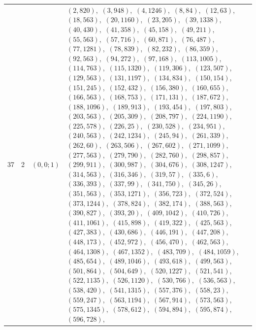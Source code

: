 \documentclass[11pt]{article}
\begin{document}
\begin{longtable}{@{}rrl>{\raggedright\arraybackslash}p{}@{}}
37 & 2 & $(0,0;1)$ & $(2,820)$,\allowbreak\ $(3,948)$,\allowbreak\ $(4,1246)$,\allowbreak\ $(8,84)$,\allowbreak\ $(12,63)$,\allowbreak\ $(18,563)$,\allowbreak\ $(20,1160)$,\allowbreak\ $(23,205)$,\allowbreak\ $(39,1338)$,\allowbreak\ $(40,430)$,\allowbreak\ $(41,358)$,\allowbreak\ $(45,158)$,\allowbreak\ $(49,211)$,\allowbreak\ $(55,563)$,\allowbreak\ $(57,716)$,\allowbreak\ $(60,871)$,\allowbreak\ $(76,487)$,\allowbreak\ $(77,1281)$,\allowbreak\ $(78,839)$,\allowbreak\ $(82,232)$,\allowbreak\ $(86,359)$,\allowbreak\ $(92,563)$,\allowbreak\ $(94,272)$,\allowbreak\ $(97,168)$,\allowbreak\ $(113,1005)$,\allowbreak\ $(114,763)$,\allowbreak\ $(115,1320)$,\allowbreak\ $(119,306)$,\allowbreak\ $(123,507)$,\allowbreak\ $(129,563)$,\allowbreak\ $(131,1197)$,\allowbreak\ $(134,834)$,\allowbreak\ $(150,154)$,\allowbreak\ $(151,245)$,\allowbreak\ $(152,432)$,\allowbreak\ $(156,380)$,\allowbreak\ $(160,655)$,\allowbreak\ $(166,563)$,\allowbreak\ $(168,753)$,\allowbreak\ $(171,131)$,\allowbreak\ $(187,672)$,\allowbreak\ $(188,1096)$,\allowbreak\ $(189,913)$,\allowbreak\ $(193,454)$,\allowbreak\ $(197,803)$,\allowbreak\ $(203,563)$,\allowbreak\ $(205,309)$,\allowbreak\ $(208,797)$,\allowbreak\ $(224,1190)$,\allowbreak\ $(225,578)$,\allowbreak\ $(226,25)$,\allowbreak\ $(230,528)$,\allowbreak\ $(234,951)$,\allowbreak\ $(240,563)$,\allowbreak\ $(242,1234)$,\allowbreak\ $(245,94)$,\allowbreak\ $(261,339)$,\allowbreak\ $(262,60)$,\allowbreak\ $(263,506)$,\allowbreak\ $(267,602)$,\allowbreak\ $(271,1099)$,\allowbreak\ $(277,563)$,\allowbreak\ $(279,790)$,\allowbreak\ $(282,760)$,\allowbreak\ $(298,857)$,\allowbreak\ $(299,911)$,\allowbreak\ $(300,987)$,\allowbreak\ $(304,676)$,\allowbreak\ $(308,1247)$,\allowbreak\ $(314,563)$,\allowbreak\ $(316,346)$,\allowbreak\ $(319,57)$,\allowbreak\ $(335,6)$,\allowbreak\ $(336,393)$,\allowbreak\ $(337,99)$,\allowbreak\ $(341,750)$,\allowbreak\ $(345,26)$,\allowbreak\ $(351,563)$,\allowbreak\ $(353,1271)$,\allowbreak\ $(356,723)$,\allowbreak\ $(372,524)$,\allowbreak\ $(373,1244)$,\allowbreak\ $(378,824)$,\allowbreak\ $(382,174)$,\allowbreak\ $(388,563)$,\allowbreak\ $(390,827)$,\allowbreak\ $(393,20)$,\allowbreak\ $(409,1042)$,\allowbreak\ $(410,726)$,\allowbreak\ $(411,1061)$,\allowbreak\ $(415,898)$,\allowbreak\ $(419,322)$,\allowbreak\ $(425,563)$,\allowbreak\ $(427,383)$,\allowbreak\ $(430,686)$,\allowbreak\ $(446,191)$,\allowbreak\ $(447,208)$,\allowbreak\ $(448,173)$,\allowbreak\ $(452,972)$,\allowbreak\ $(456,470)$,\allowbreak\ $(462,563)$,\allowbreak\ $(464,1308)$,\allowbreak\ $(467,1352)$,\allowbreak\ $(483,709)$,\allowbreak\ $(484,1059)$,\allowbreak\ $(485,654)$,\allowbreak\ $(489,1046)$,\allowbreak\ $(493,618)$,\allowbreak\ $(499,563)$,\allowbreak\ $(501,864)$,\allowbreak\ $(504,649)$,\allowbreak\ $(520,1227)$,\allowbreak\ $(521,541)$,\allowbreak\ $(522,1135)$,\allowbreak\ $(526,1120)$,\allowbreak\ $(530,766)$,\allowbreak\ $(536,563)$,\allowbreak\ $(538,420)$,\allowbreak\ $(541,1315)$,\allowbreak\ $(557,376)$,\allowbreak\ $(558,23)$,\allowbreak\ $(559,247)$,\allowbreak\ $(563,1194)$,\allowbreak\ $(567,914)$,\allowbreak\ $(573,563)$,\allowbreak\ $(575,1345)$,\allowbreak\ $(578,612)$,\allowbreak\ $(594,894)$,\allowbreak\ $(595,874)$,\allowbreak\ $(596,728)$,\allowbreak\ 
\end{longtable}
\end{document}
